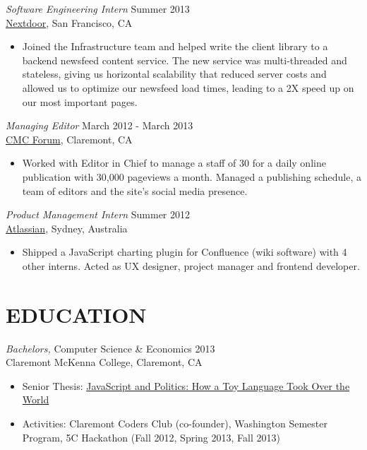 \documentclass[margin, 10pt]{res} %
\begin{document}
\begin{resume}
{\sl Software Engineering Intern} \hfill Summer 2013 \\
\href{http://www.nextdoor.com}{Nextdoor}, San Francisco, CA
\begin{itemize} \itemsep -2pt %
\item Joined the Infrastructure team and helped write the client library to a backend newsfeed content service. The new service was multi-threaded and stateless, giving us horizontal scalability that reduced server costs and allowed us to optimize our newsfeed load times, leading to a 2X speed up on our most important pages.
\end{itemize}

{\sl Managing Editor} \hfill March 2012 - March 2013 \\
\href{http://cmcforum.com/}{CMC Forum}, Claremont, CA
\begin{itemize}
\item Worked with Editor in Chief to manage a staff of 30 for a daily online publication with 30,000 pageviews a month. Managed a publishing schedule, a team of editors and the site's social media presence.
\end{itemize}

{\sl Product Management Intern} \hfill Summer 2012 \\
\href{https://www.atlassian.com/}{Atlassian}, Sydney, Australia
\begin{itemize}
\item Shipped a JavaScript charting plugin for Confluence (wiki software) with 4 other interns. Acted as UX designer, project manager and frontend developer.
\end{itemize}


\section{EDUCATION}

{\sl Bachelors,} Computer Science \& Economics \hfill 2013 \\
Claremont McKenna College, Claremont, CA
\begin{itemize} \itemsep -2pt %
\item Senior Thesis: \href{http://scholarship.claremont.edu/cmc_theses/758/}{JavaScript and Politics: How a Toy Language Took Over the World}
\item Activities: Claremont Coders Club (co-founder), Washington Semester Program, 5C Hackathon (Fall 2012, Spring 2013, Fall 2013)
\end{itemize}


\end{resume}
\end{document}
